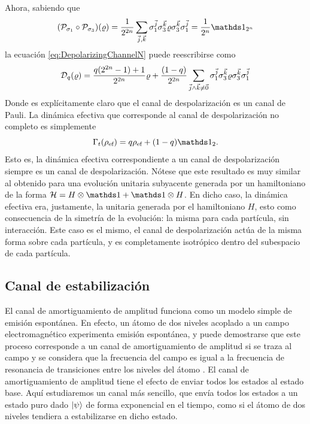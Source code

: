 Ahora, sabiendo que
\begin{equation}
    \qty(\mcP_{\pauli{1}}\circ \mcP_{\pauli{3}})(\varrho)=\frac{1}{2^{2n}}\sum_{\vec{j},\vec{k}}\pauli{1}^{\vec{j}}\pauli{3}^{\vec{k}}\varrho\pauli{3}^{\vec{k}}\pauli{1}^{\vec{j}}=\frac{1}{2^{n}}\Id_{2^{n}}\nonumber
\end{equation}
la ecuación \ref{eq:DepolarizingChannelN} puede reescribirse como
\begin{equation}
    \mathcal{D}_{q}(\varrho)=\frac{q(2^{2n}-1)+1}{2^{2n}}\varrho+\frac{(1-q)}{2^{2n}}\sum_{\vec{j}\land\vec{k}\neq\vec{0}}\sigma_{1}^{\vec{j}}\sigma_{3}^{\vec{k}}\varrho\sigma_{3}^{\vec{k}}\sigma_{1}^{\vec{j}}\nonumber
\end{equation}
Donde es explícitamente claro que el canal de despolarización es un canal de Pauli. La dinámica efectiva que corresponde al canal de despolarización no completo es simplemente
\begin{equation}\label{eq:EffectiveDepolarizing}
    \Gamma_{t}(\rho_{\ef})=q\rho_{\ef}+(1-q)\Id_{2}.
\end{equation}
Esto es, la dinámica efectiva correspondiente a un canal de despolarización siempre es un canal de despolarización. Nótese que este resultado es muy similar al obtenido para una evolución unitaria subyacente generada por un hamiltoniano de la forma $\mcH=H\otimes\Id+\Id\otimes H$. En dicho caso, la dinámica efectiva era, justamente, la unitaria generada por el hamiltoniano $H$, esto como consecuencia de la simetría de la evolución: la misma para cada partícula, sin interacción. Este caso es el mismo, el canal de despolarización actúa de la misma forma sobre cada partícula, y es completamente isotrópico dentro del subespacio de cada partícula.

\subsection{Canal de estabilización}

El canal de amortiguamiento de amplitud funciona como un modelo simple de emisión espontánea. En efecto, un átomo de dos niveles acoplado a un campo electromagnético experimenta emisión espontánea, y puede demostrarse que este proceso corresponde a un canal de amortiguamiento de amplitud si se traza al campo y se considera que la frecuencia del campo es igual a la frecuencia de resonancia de transiciones entre los niveles del átomo \cite{Fox}. El canal de amortiguamiento de amplitud tiene el efecto de enviar todos los estados al estado base. Aquí estudiaremos un canal más sencillo, que envía todos los estados a un estado puro dado $\ket{\psi}$ de forma exponencial en el tiempo, como si el átomo de dos niveles tendiera a estabilizarse en dicho estado.

